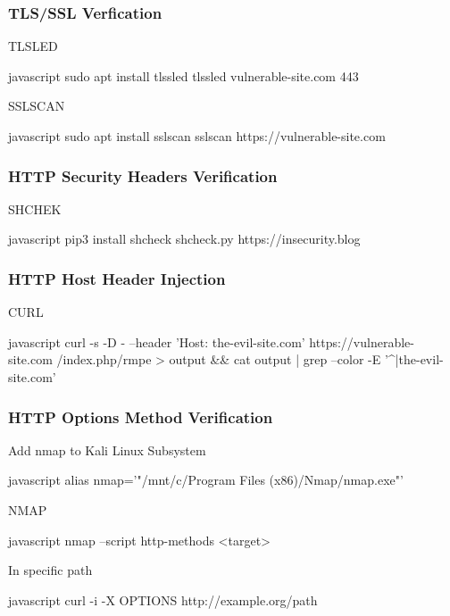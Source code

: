 \documentclass[letterpaper,12pt]{extarticle}
\begin{document}
\subsubsection{TLS/SSL Verfication}

TLSLED
\begin{sourcecode}{javascript}
sudo apt install tlssled
tlssled vulnerable-site.com 443
\end{sourcecode}

SSLSCAN
\begin{sourcecode}{javascript}
sudo apt install sslscan
sslscan https://vulnerable-site.com 
\end{sourcecode}

\subsubsection{HTTP Security Headers Verification}

SHCHEK
\begin{sourcecode}{javascript}
pip3 install shcheck
shcheck.py https://insecurity.blog
\end{sourcecode}

\subsubsection{HTTP Host Header Injection}

CURL
\begin{sourcecode}{javascript}
curl -s -D - --header 'Host: the-evil-site.com' https://vulnerable-site.com /index.php/rmpe > output && cat output | grep --color -E '^|the-evil-site.com' 
\end{sourcecode}


\subsubsection{HTTP Options Method Verification}

Add nmap to Kali Linux Subsystem
\begin{sourcecode}{javascript}
alias nmap='"/mnt/c/Program Files (x86)/Nmap/nmap.exe"'
\end{sourcecode}

NMAP
\begin{sourcecode}{javascript}
nmap --script http-methods <target>
\end{sourcecode}

In specific path
\begin{sourcecode}{javascript}
curl -i -X OPTIONS http://example.org/path
\end{sourcecode}
\end{document}

